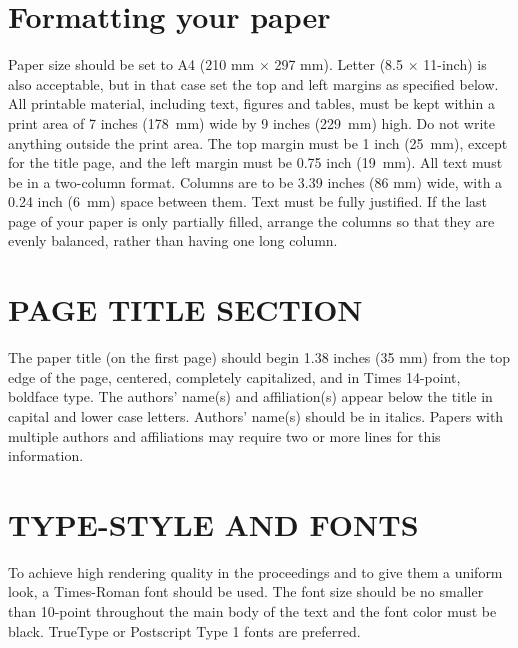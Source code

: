 \documentclass[a4paper]{article}
\begin{document}
\section{Formatting your paper}
\label{sec:format}

Paper size should be set to A4 (210 mm $\times$ 297 mm). Letter (8.5 $\times$ 11-inch) is also acceptable, but in that case set the top and left margins as specified below. All printable material, including text, figures and tables, must be kept within a print area of 7 inches (178~mm) wide by 9 inches (229~mm) high. Do not write anything outside the print area. The top margin must be 1 inch (25~mm), except for the title page, and the left margin must be 0.75 inch (19~mm).  All text must be in a two-column format. Columns are to be 3.39 inches (86 mm) wide, with a 0.24 inch (6~mm) space between them. Text must be fully justified. If the last page of your paper is only partially filled, arrange the columns so that they are evenly balanced, rather than having one long column.


\section{PAGE TITLE SECTION}
\label{sec:pagestyle}

The paper title (on the first page) should begin 1.38 inches (35 mm) from the
top edge of the page, centered, completely capitalized, and in Times 14-point,
boldface type. The authors' name(s) and affiliation(s) appear below the title
in capital and lower case letters. Authors' name(s) should be in italics.
Papers with multiple authors and affiliations may require two or more lines for this information.

\section{TYPE-STYLE AND FONTS}
\label{sec:typestyle}

To achieve high rendering quality in the proceedings and to give them a uniform look, a Times-Roman font should be used. The font size should be no smaller than 10-point throughout the main body of the text and the font color must be black. TrueType or Postscript Type 1 fonts are preferred.
\end{document}
